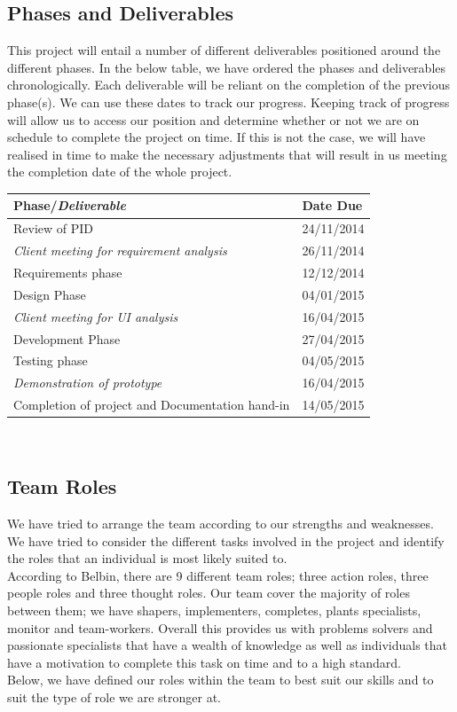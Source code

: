 \subsection{Phases and Deliverables}
This project will entail a number of different deliverables positioned around the different phases.  In the below table, we have ordered the phases and deliverables chronologically.  Each deliverable will be reliant on the completion of the previous phase(s).  We can use these dates to track our progress.  Keeping track of progress will allow us to access our position and determine whether or not we are on schedule to complete the project on time.  If this is not the case, we will have realised in time to make the necessary adjustments that will result in us meeting the completion date of the whole project.  \\

\noindent
\begin{tabular}{|l || p{6cm}|}
\hline
\textbf{Phase/\emph{Deliverable}} & \textbf{Date Due} \\ \hline
Review of PID & 24/11/2014 \\ \hline
\emph{Client meeting for requirement analysis} & 26/11/2014 \\ \hline
Requirements phase & 12/12/2014 \\ \hline
Design Phase & 04/01/2015 \\ \hline
\emph{Client meeting for UI analysis} & 16/04/2015 \\ \hline
Development Phase & 27/04/2015 \\ \hline
Testing phase & 04/05/2015 \\ \hline
\emph{Demonstration of prototype} & 16/04/2015 \\ \hline
Completion of project and Documentation hand-in & 14/05/2015 \\ \hline
\end{tabular}\\
\vspace{0.5cm}

\subsection{Team Roles}
We have tried to arrange the team according to our strengths and weaknesses.  We have tried to consider the different tasks involved in the project and identify the roles that an individual is most likely suited to.  \\
According to Belbin, there are 9 different team roles; three action roles, three people roles and three thought roles.  Our team cover the majority of roles between them; we have shapers, implementers, completes, plants specialists, monitor and team-workers.  Overall this provides us with problems solvers and passionate specialists that have a wealth of knowledge as well as individuals that have a  motivation to complete this task on time and to a high standard. \\
Below, we have defined our roles within the team to best suit our skills and to suit the type of role we are stronger at.

